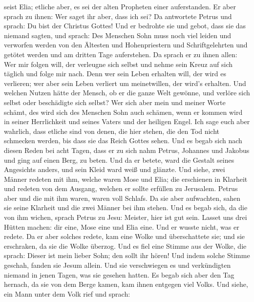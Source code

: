 seist Elia; etliche aber, es sei der alten Propheten einer auferstanden.
 Er aber sprach zu ihnen: Wer saget ihr aber, dass ich sei?
Da antwortete Petrus und sprach: Du bist der Christus Gottes!
 Und er bedrohte sie und gebot, dass sie das niemand
sagten,  und sprach: Des Menschen Sohn muss noch viel
leiden und verworfen werden von den Ältesten und Hohenpriestern und
Schriftgelehrten und getötet werden und am dritten Tage auferstehen.
 Da sprach er zu ihnen allen: Wer mir folgen will, der
verleugne sich selbst und nehme sein Kreuz auf sich täglich und folge
mir nach.  Denn wer sein Leben erhalten will, der wird es
verlieren; wer aber sein Leben verliert um meinetwillen, der wird's
erhalten.  Und welchen Nutzen hätte der Mensch, ob er die
ganze Welt gewönne, und verlöre sich selbst oder beschädigte sich
selbst?  Wer sich aber mein und meiner Worte schämt, des
wird sich des Menschen Sohn auch schämen, wenn er kommen wird in seiner
Herrlichkeit und seines Vaters und der heiligen Engel.  Ich
sage euch aber wahrlich, dass etliche sind von denen, die hier stehen,
die den Tod nicht schmecken werden, bis dass sie das Reich Gottes sehen.
 Und es begab sich nach diesen Reden bei acht Tagen, dass
er zu sich nahm Petrus, Johannes und Jakobus und ging auf einen Berg, zu
beten.  Und da er betete, ward die Gestalt seines
Angesichts anders, und sein Kleid ward weiß und glänzte. 
Und siehe, zwei Männer redeten mit ihm, welche waren Mose und Elia;
 die erschienen in Klarheit und redeten von dem Ausgang,
welchen er sollte erfüllen zu Jerusalem.  Petrus aber und
die mit ihm waren, waren voll Schlafs. Da sie aber aufwachten, sahen sie
seine Klarheit und die zwei Männer bei ihm stehen.  Und es
begab sich, da die von ihm wichen, sprach Petrus zu Jesu: Meister, hier
ist gut sein. Lasset uns drei Hütten machen: dir eine, Mose eine und
Elia eine. Und er wusste nicht, was er redete.  Da er aber
solches redete, kam eine Wolke und überschattete sie; und sie
erschraken, da sie die Wolke überzog.  Und es fiel eine
Stimme aus der Wolke, die sprach: Dieser ist mein lieber Sohn; den sollt
ihr hören!  Und indem solche Stimme geschah, fanden sie
Jesum allein. Und sie verschwiegen es und verkündigten niemand in jenen
Tagen, was sie gesehen hatten.  Es begab sich aber den Tag
hernach, da sie von dem Berge kamen, kam ihnen entgegen viel Volks.
 Und siehe, ein Mann unter dem Volk rief und sprach:
